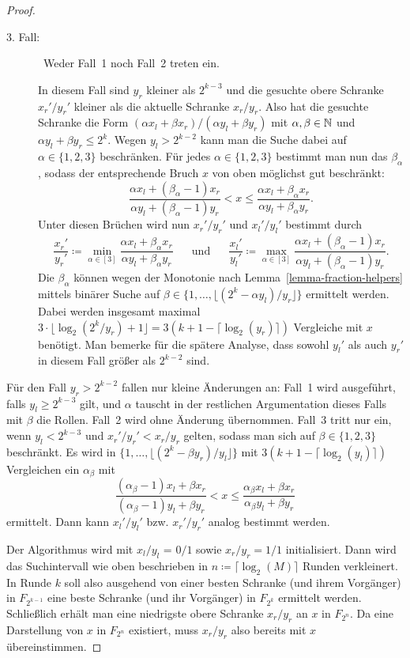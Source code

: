 \begin{proof}
\begin{description}
		\item[3. Fall:]~Weder Fall~1 noch Fall~2 treten ein.
		
			In diesem Fall sind $y_r$ kleiner als $2^{k-3}$ und die gesuchte obere Schranke $x_r'/y_r'$ kleiner als die aktuelle Schranke $x_r/y_r$.
			Also hat die gesuchte Schranke die Form $(\alpha x_l + \beta x_r)/(\alpha y_l + \beta y_r)$ mit $\alpha,\beta\in\mathbb{N}$ und $\alpha y_l + \beta y_r\leq 2^{k}$.
			Wegen $y_l > 2^{k-2}$ kann man die Suche dabei auf $\alpha \in \{ 1, 2, 3 \}$ beschränken.
			Für jedes $\alpha\in\{1,2,3\}$ bestimmt man nun das $\beta_\alpha$, sodass der entsprechende Bruch $x$ von oben möglichst gut beschränkt:
			\[
				\frac{\alpha x_l + (\beta_\alpha - 1) x_r}{\alpha y_l + (\beta_\alpha - 1) y_r} < x \leq \frac{\alpha x_l + \beta_\alpha x_r}{\alpha y_l + \beta_\alpha y_r}.
			\]
			Unter diesen Brüchen wird nun $x_r'/y_r'$ und $x_l'/y_l'$ bestimmt durch
			\[\frac{x_r'}{y_r'}\coloneq \min_{\alpha\in[3]} \frac{\alpha x_l + \beta_\alpha x_r}{\alpha y_l + \beta_\alpha y_r}
			\text{~~~~~und~~~~~}
			\frac{x_l'}{y_l'}\coloneq \max_{\alpha\in[3]} 			\frac{\alpha x_l + (\beta_\alpha - 1)x_r}{\alpha y_l + (\beta_\alpha - 1)y_r}.
			\]
			Die $\beta_\alpha$ können wegen der Monotonie nach Lemma~\ref{lemma-fraction-helpers} mittels binärer Suche auf $\beta \in \{1,\dots, \lfloor (2^{k} - \alpha y_l) / y_r \rfloor \}$ ermittelt werden.
			Dabei werden insgesamt maximal $3 \cdot \lfloor \log_2(2^{k} / y_r) + 1 \rfloor = 3 (k+1 - \lceil\log_2(y_r)\rceil)$ Vergleiche mit $x$ benötigt.
			Man bemerke für die spätere Analyse, dass sowohl $y_l'$ als auch $y_r'$ in diesem Fall größer als $2^{k-2}$ sind.
 	\end{description}
 
 	Für den Fall $y_r > 2^{k-2}$ fallen nur kleine Änderungen an:
 	Fall~1 wird ausgeführt, falls $y_l \geq 2^{k-3}$ gilt, und $\alpha$ tauscht in der restlichen Argumentation dieses Falls mit $\beta$ die Rollen.
 	Fall~2 wird ohne Änderung übernommen.
 	Fall~3 tritt nur ein, wenn $y_l<2^{k-3}$ und $x_r'/y_r' < x_r/y_r$ gelten, sodass man sich auf $\beta\in\{1, 2, 3\}$ beschränkt.
 	Es wird in $\{1,\dots, \lfloor ( 2^k - \beta y_r)/y_l \rfloor \}$ mit $3(k+1-\lceil \log_2(y_l) \rceil)$ Vergleichen ein $\alpha_\beta$ mit \[
 		\frac{(\alpha_\beta - 1) x_l + \beta x_r}{(\alpha_\beta - 1) y_l + \beta y_r} < x \leq \frac{\alpha_\beta x_l + \beta x_r}{\alpha_\beta y_l + \beta y_r}
 	\]
 	ermittelt.
 	Dann kann $x_l'/y_l'$ bzw. $x_r'/y_r'$ analog bestimmt werden.
 	
 	Der Algorithmus wird mit $x_l/y_l$ = $0/1$ sowie $x_r/y_r = 1/1$ initialisiert.
 	Dann wird das Suchintervall wie oben beschrieben in $n\coloneq \lceil \log_2(M) \rceil$ Runden verkleinert.
 	In Runde $k$ soll also ausgehend von einer besten Schranke (und ihrem Vorgänger) in $F_{2^{k-1}}$ eine beste Schranke (und ihr Vorgänger) in $F_{2^{k}}$ ermittelt werden.
 	Schließlich erhält man eine niedrigste obere Schranke $x_r/y_r$ an $x$ in $F_{2^n}$.
 	Da eine Darstellung von $x$ in $F_{2^n}$ existiert, muss $x_r/y_r$ also bereits mit $x$ übereinstimmen.
 	

\end{proof}
